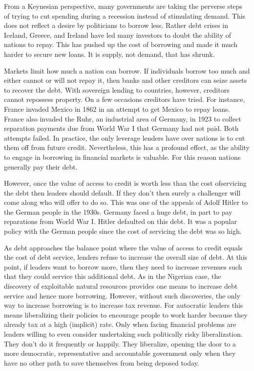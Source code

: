 \documentclass[10pt]{article}
\begin{document}
{\large From a Keynesian perspective, many governments are taking the perverse
steps of trying to cut spending during a recession instead of stimulating demand.
This does not reflect a desire by politicians to borrow less. Rather debt crises
in Iceland, Greece, and Ireland have led many investors to doubt the ability of
nations to repay. This has pushed up the cost of borrowing and made it much
harder to secure new loans. It is supply, not demand, that has shrunk.}

{\large Markets limit how much a nation can borrow. If individuals borrow too
much and either cannot or will not repay it, then banks and other creditors can
seize assets to recover the debt. With sovereign lending to countries, however,
creditors cannot repossess property. On a few occasions creditors have tried. For
instance, France invaded Mexico in 1862 in an attempt to get Mexico to repay
loans. France also invaded the Ruhr, an industrial area of Germany, in 1923 to
collect reparation payments due from World War I that Germany had not paid. Both
attempts failed. In practice, the only leverage lenders have over nations is to
cut them off from future credit. Nevertheless, this has a profound effect, as the
ability to engage in borrowing in financial markets is valuable. For this reason
nations generally pay their debt.}

{\large However, once the value of access to credit is worth less than the cost
ofservicing the debt then leaders should default. If they don't then surely a
challenger will come along who will offer to do so. This was one of the appeals
of Adolf Hitler to the German people in the 1930s. Germany faced a huge debt, in
part to pay reparations from World War I. Hitler defaulted on this debt. It was a
popular policy with the German people since the cost of servicing the debt was so
high.}

{\large As debt approaches the balance point where the value of access to credit
equals the cost of debt service, lenders refuse to increase the overall size of
debt. At this point, if leaders want to borrow more, then they need to increase
revenues such that they could service this additional debt. As in the Nigerian
case, the discovery of exploitable natural resources provides one means to
increase debt service and hence more borrowing. However, without such
discoveries, the only way to increase borrowing is to increase tax revenue. For
autocratic leaders this means liberalizing their policies to encourage people to
work harder because they already tax at a high (implicit) rate. Only when facing
financial problems are leaders willing to even consider undertaking such
politically risky liberalization. They don't do it frequently or happily. They
liberalize, opening the door to a more democratic, representative and accountable
government only when they have no other path to save themselves from being
deposed today.}
\end{document}
